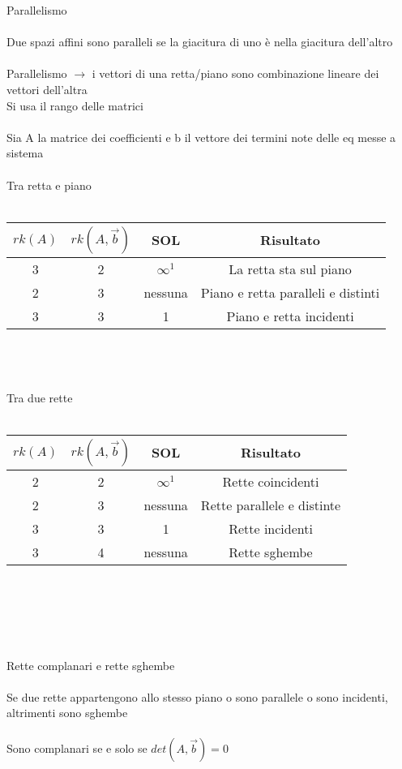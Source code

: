 \documentclass{article}
\begin{document}
{\Large Parallelismo}\\\\
Due spazi affini sono paralleli se la giacitura di uno è nella giacitura dell'altro\\\\
Parallelismo \(\rightarrow{}\) i vettori di una retta/piano sono combinazione lineare dei vettori dell'altra\\
Si usa il rango delle matrici\\\\
{\large Sia A la matrice dei coefficienti e b il vettore dei termini note delle eq messe a sistema}\\\\
Tra retta e piano\\\\
\begin{tabular}{|c|c|c|c|}
    \hline
    \(rk(A)\) & \(rk(A,\vec{b})\) & SOL & Risultato \\
    \hline
    3 & 2 & \(\infty^1\) & La retta sta sul piano \\
    \hline
    2 & 3 & nessuna & Piano e retta paralleli e distinti \\
    \hline
    3 & 3 & 1 & Piano e retta incidenti \\
    \hline
\end{tabular}\\\\\\
Tra due rette\\\\
\begin{tabular}{|c|c|c|c|}
    \hline
    \(rk(A)\) & \(rk(A,\vec{b})\) & SOL & Risultato \\
    \hline
    2 & 2 & \(\infty^1\) & Rette coincidenti \\
    \hline
    2 & 3 & nessuna &  Rette parallele e distinte\\
    \hline
    3 & 3 & 1 & Rette incidenti \\
    \hline
    3 & 4 & nessuna & Rette sghembe \\
    \hline
\end{tabular}\\\\\\\\\\
{\large Rette complanari e rette sghembe}\\\\
Se due rette appartengono allo stesso piano o sono parallele o sono incidenti, altrimenti sono sghembe\\\\
Sono complanari se e solo se \(det(A,\vec{b})=0\)
\end{document}

